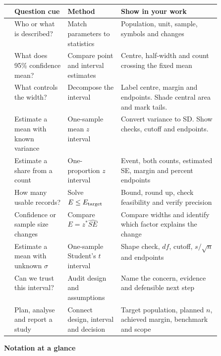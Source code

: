 {\small\noindent
\begin{tabularx}{\linewidth}{@{}l P{0.25\linewidth} P{0.25\linewidth} Y@{}}
  \toprule
  & \textbf{Question cue} & \textbf{Method} & \textbf{Show in your work}\\
  \midrule
   & Who or what is described? & Match parameters to statistics & Population, unit, sample, symbols and changes\\
   & What does 95\% confidence mean? & Compare point and interval estimates & Centre, half-width and count crossing the fixed mean\\
   & What controls the width? & Decompose the interval & Label centre, margin and endpoints. Shade central area and mark tails.\\
   & Estimate a mean with known variance & One-sample mean \(z\) interval & Convert variance to SD. Show checks, cutoff and endpoints.\\
   & Estimate a share from a count & One-proportion \(z\) interval & Event, both counts, estimated SE, margin and percent endpoints\\
   & How many usable records? & Solve \(E\le E_{\rm target}\) & Bound, round up, check feasibility and verify precision\\
   & Confidence or sample size changes & Compare \(E=z^*\widehat{SE}\) & Compare widths and identify which factor explains the change\\
   & Estimate a mean with unknown \(\sigma\) & One-sample Student's \(t\) interval & Shape check, \(df\), cutoff, \(s/\sqrt n\) and endpoints\\
   & Can we trust this interval? & Audit design and assumptions & Name the concern, evidence and defensible next step\\
   & Plan, analyse and report a study & Connect design, interval and decision & Target population, planned \(n\), achieved margin, benchmark and scope\\
  \bottomrule
\end{tabularx}\par
}

\clearpage
\enlargethispage{12pt}
\textbf{Notation at a glance}

